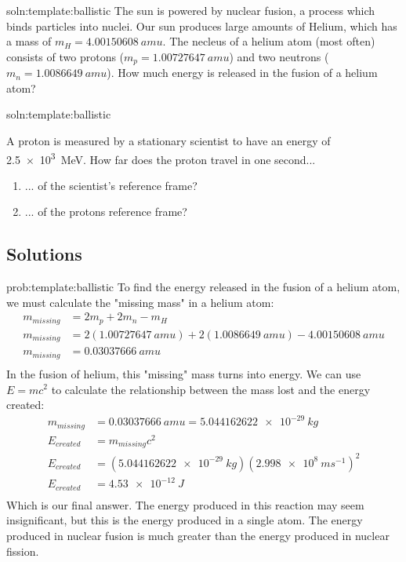 \begin{problem}{soln:template:ballistic}{\label{prob:template:ballistic} 
The sun is powered by nuclear fusion, a process which binds particles into nuclei. Our sun produces large amounts of Helium, which has a mass of $m_H = \SI{4.00150608}{amu}$. The necleus of a helium atom (most often) consists of two protons ($m_p = \SI{1.00727647}{amu}$) and two neutrons ($m_n = \SI{1.0086649}{amu}$). How much energy is released in the fusion of a helium atom?
}
\end{problem}

\begin{problem}{soln:template:ballistic}{\label{prob:template:ballistic} 
		A proton is measured by a stationary scientist to have an energy of \SI{2.5e3}{MeV}. How far does the proton travel in one second...
		\begin{enumerate}[label=\alph*),topsep=-10pt]
			\item ... of the scientist's reference frame?
			\item ... of the protons reference frame?
		\end{enumerate}
	}
\end{problem}

\newpage
\subsection{Solutions}
\begin{solution}{prob:template:ballistic}\label{soln:template:ballistic}
To find the energy released in the fusion of a helium atom, we must calculate the "missing mass" in a helium atom:
\begin{align*}
m_{missing} &= 2m_p +2m_n - m_H\\
m_{missing} &= 2(\SI{1.00727647}{amu}) +2(\SI{1.0086649}{amu}) - \SI{4.00150608}{amu}\\
m_{missing} &= \SI{0.03037666}{amu}\\
\end{align*}
In the fusion of helium, this "missing" mass turns into energy. We can use $E=mc^2$ to calculate the relationship between the mass lost and the energy created:
\begin{align*}
m_{missing} &= \SI{0.03037666}{amu} = \SI{5.044162622e-29}{kg}\\
E_{created} &= m_{missing}c^2\\
E_{created} &= (\SI{5.044162622e-29}{kg})(\SI{2.998e8}{ms^{-1}})^2\\
E_{created} &= \SI{4.53e-12}{J}\\
\end{align*}
Which is our final answer. The energy produced in this reaction may seem insignificant, but this is the energy produced in a single atom. The energy produced in nuclear fusion is much greater than the energy produced in nuclear fission.
\end{solution}

